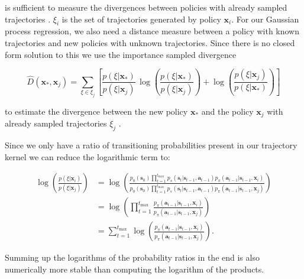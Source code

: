 is sufficient to measure the divergences between policies with already sampled trajectories \cite{wilson2014using}. $\xi_i$ is the set of trajectories generated by policy $\mathbf{x}_i$. For our Gaussian process regression, we also need a distance measure between a policy with known trajectories and new policies with unknown trajectories. Since there is no closed form solution to this we use the importance sampled divergence

$$\hat{D}(\mathbf{x}_\mathrm{ * }, \mathbf{x}_{ j }) = \sum _{\xi \in \xi_j} \left[\frac{p(\xi|\mathbf{x}_\mathrm{ * })}{p(\xi|\mathbf{x}_{ j })}\,\log\left(\frac{p(\xi|\mathbf{x}_\mathrm{ * })}{p(\xi|\mathbf{x}_{j})}\right)+\log\left(\frac{p(\xi|\mathbf{x}_{ j })}{p(\xi|\mathbf{x}_\mathrm{ * })}\right)\right] $$

to estimate the divergence between the new policy $\mathbf{x}_\mathrm{ * }$ and the policy $\mathbf{x}_j$ with already sampled trajectories $\xi_j$ \cite{wilson2014using}.

Since we only have a ratio of transitioning probabilities present in our trajectory kernel we can reduce the logarithmic term to:

\begin{align*}
    \log\left(\frac{p(\xi|\mathbf{x}_i)}{p(\xi|\mathbf{x}_j)}\right)
    &= \log\left(\frac{p_{0}(\mathbf{s}_{0}) \prod_{t=1}^{t_\mathrm{max}} p_s(\mathbf{s}_{t}|\mathbf{s}_{t-1},\mathbf{a}_{t-1}) p_{\pi}(\mathbf{a}_{t-1}|\mathbf{s}_{t-1},\mathbf{x}_i)}{p_{0}(\mathbf{s}_{0}) \prod_{t=1}^{t_\mathrm{max}} p_s(\mathbf{s}_{t}|\mathbf{s}_{t-1},\mathbf{a}_{t-1}) p_{\pi}(\mathbf{a}_{t-1}|\mathbf{s}_{t-1},\mathbf{x}_j)}\right)\\
    &= \log\left(\prod_{t=1}^{t_\mathrm{max}}\frac{ p_{\pi}(\mathbf{a}_{t-1}|\mathbf{s}_{t-1},\mathbf{x}_i)}{p_{\pi}(\mathbf{a}_{t-1}|\mathbf{s}_{t-1},\mathbf{x}_j)}\right)\\
    &= \sum_{t=1}^{t_\mathrm{max}} \log \left(\frac{p_{\pi}(\mathbf{a}_{t-1}|\mathbf{s}_{t-1},\mathbf{x}_i)}{p_{\pi}(\mathbf{a}_{t-1}|\mathbf{s}_{t-1},\mathbf{x}_j)}\right).
\end{align*}

Summing up the logarithms of the probability ratios in the end is also numerically more stable than computing the logarithm of the products.

